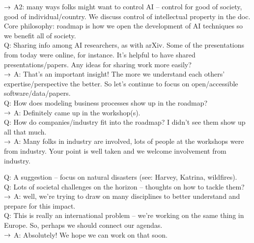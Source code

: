 $\rightarrow$ A2: many ways folks might want to control AI -- control for good of society, good of individual/country. We discuss control of intellectual property in the doc. Core philosophy: roadmap is how we open the development of AI techniques so we benefit all of society. \\

Q: Sharing info among AI researchers, as with arXiv. Some of the presentations from today were online, for instance. It's helpful to have shared presentations/papers. Any ideas for sharing work more easily? \\

$\rightarrow$ A: That's an important insight! The more we understand each others' expertise/perspective the better. So let's continue to focus on open/accessible software/data/papers. \\

Q: How does modeling business processes show up in the roadmap? \\

$\rightarrow$ A: Definitely came up in the workshop(s). \\

Q: How do companies/industry fit into the roadmap? I didn't see them show up all that much. \\

$\rightarrow$ A: Many folks in industry are involved, lots of people at the workshops were from industry. Your point is well taken and we welcome involvement from industry. \\


Q: A suggestion -- focus on natural disasters (see: Harvey, Katrina, wildfires). \\

Q: Lots of societal challenges on the horizon -- thoughts on how to tackle them? \\

$\rightarrow$ A: well, we're trying to draw on many disciplines to better understand and prepare for this impact. \\

Q: This is really an international problem -- we're working on the same thing in Europe. So, perhaps we should connect our agendas. \\

$\rightarrow$ A: Absolutely! We hope we can work on that soon. \\

